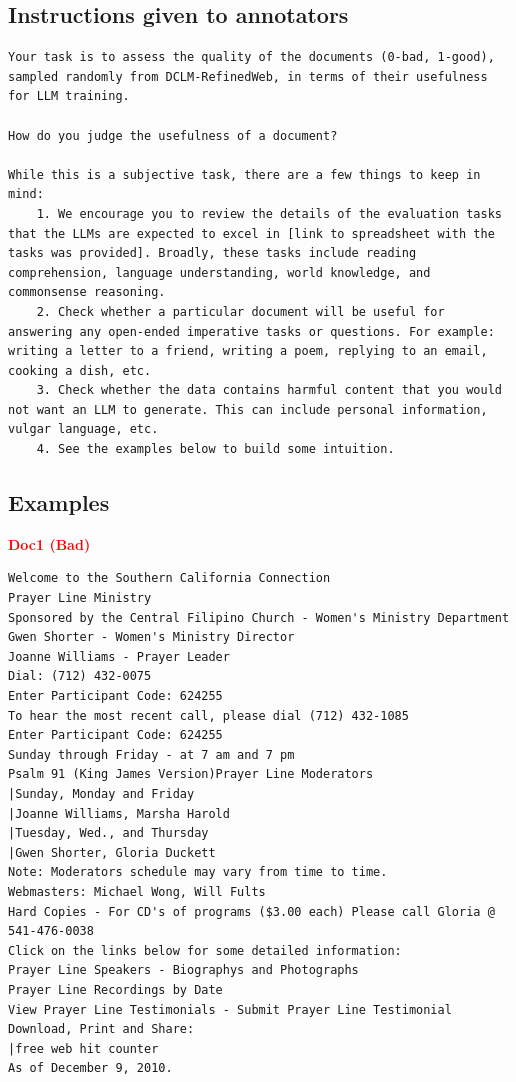 \documentclass{article}
\begin{document}
\clearpage
\subsection{Instructions given to annotators}

\begin{scriptsize}
\begin{Verbatim}[frame=single, framesep=3mm, breaklines=true]
Your task is to assess the quality of the documents (0-bad, 1-good), sampled randomly from DCLM-RefinedWeb, in terms of their usefulness for LLM training.

How do you judge the usefulness of a document?

While this is a subjective task, there are a few things to keep in mind:
    1. We encourage you to review the details of the evaluation tasks that the LLMs are expected to excel in [link to spreadsheet with the tasks was provided]. Broadly, these tasks include reading comprehension, language understanding, world knowledge, and commonsense reasoning.
    2. Check whether a particular document will be useful for answering any open-ended imperative tasks or questions. For example: writing a letter to a friend, writing a poem, replying to an email, cooking a dish, etc.
    3. Check whether the data contains harmful content that you would not want an LLM to generate. This can include personal information, vulgar language, etc.
    4. See the examples below to build some intuition.
\end{Verbatim}
\end{scriptsize}

\subsection{Examples}

\textcolor{red}{\textbf{Doc1 (Bad)}}
\begin{scriptsize}
\begin{Verbatim}[frame=single, framesep=3mm, breaklines=true]
Welcome to the Southern California Connection
Prayer Line Ministry
Sponsored by the Central Filipino Church - Women's Ministry Department
Gwen Shorter - Women's Ministry Director
Joanne Williams - Prayer Leader
Dial: (712) 432-0075
Enter Participant Code: 624255
To hear the most recent call, please dial (712) 432-1085
Enter Participant Code: 624255
Sunday through Friday - at 7 am and 7 pm
Psalm 91 (King James Version)Prayer Line Moderators
|Sunday, Monday and Friday
|Joanne Williams, Marsha Harold
|Tuesday, Wed., and Thursday
|Gwen Shorter, Gloria Duckett
Note: Moderators schedule may vary from time to time.
Webmasters: Michael Wong, Will Fults
Hard Copies - For CD's of programs ($3.00 each) Please call Gloria @ 541-476-0038
Click on the links below for some detailed information:
Prayer Line Speakers - Biographys and Photographs
Prayer Line Recordings by Date
View Prayer Line Testimonials - Submit Prayer Line Testimonial
Download, Print and Share:
|free web hit counter
As of December 9, 2010.
\end{Verbatim}
\end{scriptsize}
\end{document}
